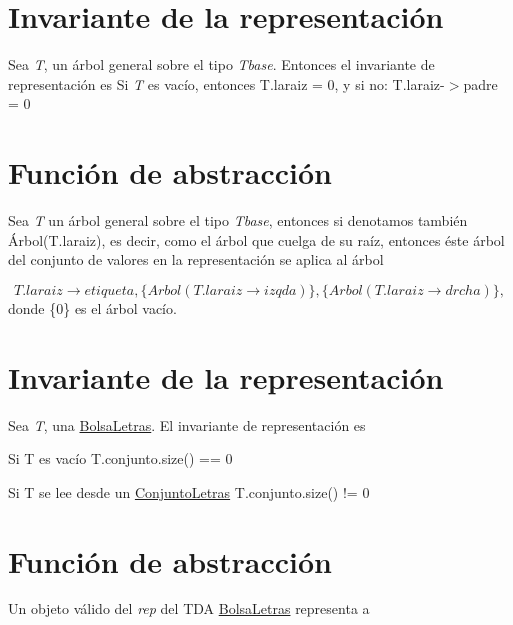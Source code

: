 \hypertarget{repConjunto_invConjunto}{}\section{Invariante de la representación}\label{repConjunto_invConjunto}
Sea {\itshape T}, un árbol general sobre el tipo {\itshape Tbase}. Entonces el invariante de representación es Si {\itshape T} es vacío, entonces T.\-laraiz = 0, y si no\-: T.\-laraiz-\/$>$padre = 0\hypertarget{repConjunto_faConjunto}{}\section{Función de abstracción}\label{repConjunto_faConjunto}
Sea {\itshape T} un árbol general sobre el tipo {\itshape Tbase}, entonces si denotamos también Árbol(T.\-laraiz), es decir, como el árbol que cuelga de su raíz, entonces éste árbol del conjunto de valores en la representación se aplica al árbol

\[ T.laraiz \rightarrow etiqueta, \{Arbol(T.laraiz \rightarrow izqda)\}, \{Arbol(T.laraiz \rightarrow drcha)\}, \] donde \{0\} es el árbol vacío.\hypertarget{repConjunto_invConjunto}{}\section{Invariante de la representación}\label{repConjunto_invConjunto}
Sea {\itshape T}, una \hyperlink{classBolsaLetras}{Bolsa\-Letras}. El invariante de representación es
\begin{DoxyItemize}
\item Si T es vacío T.\-conjunto.\-size() == 0
\item Si T se lee desde un \hyperlink{classConjuntoLetras}{Conjunto\-Letras} T.\-conjunto.\-size() != 0
\end{DoxyItemize}\hypertarget{repConjunto_faConjunto}{}\section{Función de abstracción}\label{repConjunto_faConjunto}
Un objeto válido del {\itshape rep} del T\-D\-A \hyperlink{classBolsaLetras}{Bolsa\-Letras} representa a

